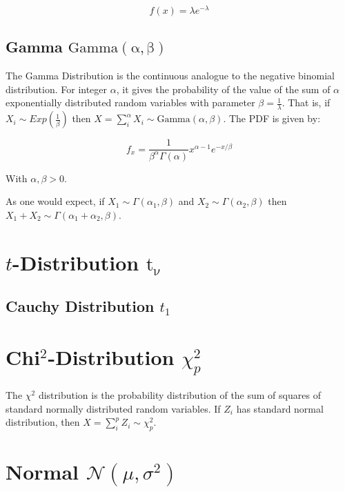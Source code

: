 \begin{equation}
f(x) = \lambda e^{-\lambda}
\end{equation}


\subsection{Gamma $\mathrm{Gamma(\alpha,\beta)}$}
The Gamma Distribution is the continuous analogue to the negative binomial distribution. For integer $\alpha$, it gives the probability of the value of the sum of $\alpha$ exponentially distributed random variables with parameter $\beta=\frac{1}{\lambda}$. That is, if $X_i \sim Exp(\frac{1}{\beta})$ then $X = \sum_i^\alpha X_i \sim \mathrm{Gamma}(\alpha,\beta)$. The PDF is given by:

\begin{equation}
f_x = \frac{1}{\beta^\alpha \Gamma(\alpha)}x^{\alpha-1}e^{-x/\beta}
\end{equation}

With $\alpha,\beta > 0$.

As one would expect, if $X_1 \sim \Gamma(\alpha_1,\beta)$ and $X_2 \sim \Gamma(\alpha_2,\beta)$ then $X_1 + X_2 \sim \Gamma(\alpha_1+\alpha_2,\beta)$. 



\section{$t$-Distribution $\mathrm{t_\nu\ }$}

\subsection{Cauchy Distribution $t_1$}



\section{Chi$^2$-Distribution $\chi^2_p$}
The $\chi^2$ distribution is the probability distribution of the sum of squares of standard normally distributed random variables. If $Z_i$ has standard normal distribution, then $X = \sum_i^p Z_i \sim \chi^2_p$.



\section{Normal $\mathscr{N}(\mu,\sigma^2)$}


